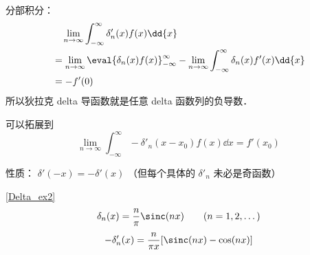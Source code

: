 
\begin{issues}
\issueDraft
\end{issues}


分部积分：
\begin{equation}
\begin{aligned}
&\quad \lim_{n\to\infty}\int_{-\infty}^\infty \delta'_n(x) f(x) \dd{x}\\
&= \lim_{n\to\infty}\eval{\delta_n(x) f(x)}_{-\infty}^\infty - \lim_{n\to\infty}\int_{-\infty}^\infty \delta_n(x) f'(x) \dd{x}\\
&= - f'(0)
\end{aligned}
\end{equation}
所以狄拉克 delta 导函数就是任意 delta 函数列的负导数．

可以拓展到
\begin{equation}
\lim_{n\to\infty}\int_{-\infty}^\infty -\delta'_n(x-x_0) f(x) \dd{x} = f'(x_0)
\end{equation}

性质： $\delta'(-x) = -\delta'(x)$ （但每个具体的 $\delta'_n$ 未必是奇函数）

\begin{example}{}
\autoref{Delta_ex2}~
\begin{equation}
\delta_n(x) = \frac{n}{\pi}\sinc(n x) \qquad (n = 1, 2, \dots)
\end{equation}
\begin{equation}
-\delta'_n(x) = \frac{n}{\pi x} [\sinc(nx) - \cos(nx)]
\end{equation}
\end{example}
